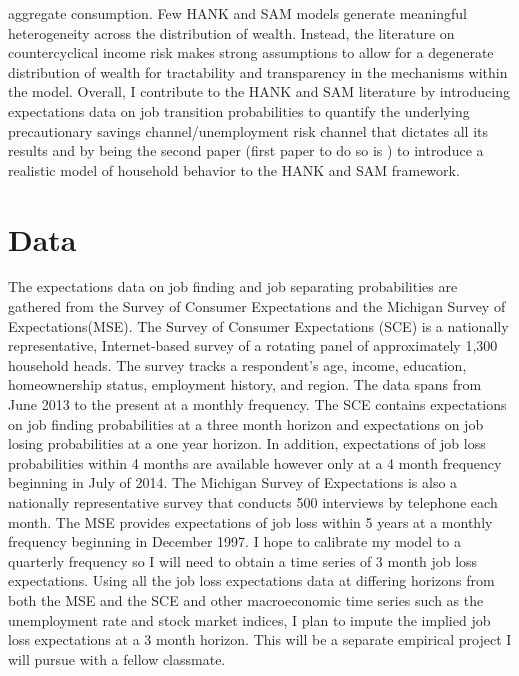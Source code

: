 \documentclass[titlepage]{\econtex}\providecommand{\texname}{Dissertation-Proposal}
\begin{document}
aggregate consumption. Few HANK and SAM models generate meaningful heterogeneity across the distribution of wealth. Instead, the literature on countercyclical income risk makes strong assumptions to allow for a degenerate distribution of wealth for tractability and transparency in the mechanisms within the model. Overall, I contribute to the HANK and SAM literature by introducing expectations data on job transition probabilities to quantify the underlying precautionary savings channel/unemployment risk channel that dictates all its results and by being the second paper (first paper to do so is \cite{gornemann2016doves}) to introduce a realistic model of household behavior to the HANK and SAM framework.




\hypertarget{Data}{}
\section{Data}

The expectations data on job finding and job separating probabilities are gathered from the Survey of Consumer Expectations and the Michigan Survey of Expectations(MSE). The Survey of Consumer Expectations (SCE) is a nationally representative, Internet-based survey of a rotating panel of approximately 1,300 household heads. The survey tracks a respondent's age, income, education, homeownership status, employment history, and region. The data spans from June 2013 to the present at a monthly frequency. The SCE contains expectations on job finding probabilities at a three month horizon and expectations on job losing probabilities at a one year horizon. In addition, expectations of job loss probabilities within 4 months are available however only at a 4 month frequency beginning in July of 2014. The Michigan Survey of Expectations is also a nationally representative survey that conducts 500 interviews by telephone each month.  The MSE provides expectations of job loss within 5 years at a monthly frequency beginning in December 1997. I hope to calibrate my model to a quarterly frequency so I will need to obtain a time series of 3 month job loss expectations. Using all the job loss expectations data at differing horizons from both the MSE and the SCE and other macroeconomic time series such as the unemployment rate and stock market indices, I plan to impute the implied job loss expectations at a 3 month horizon. This will be a separate empirical project I will pursue with a fellow classmate. \\
\end{document}

